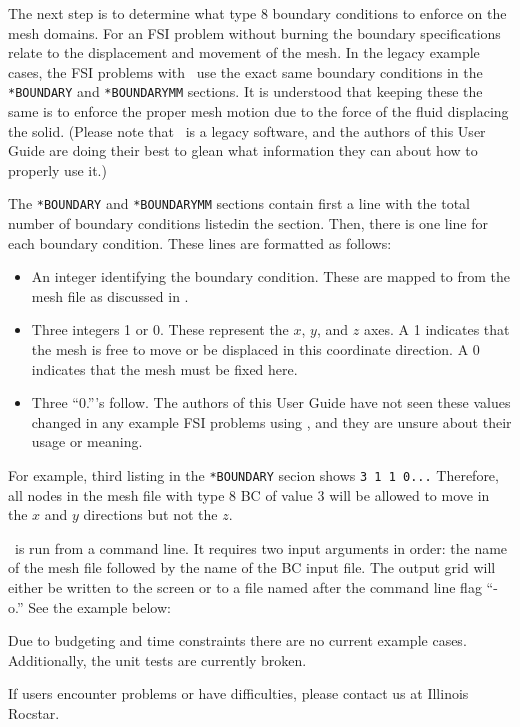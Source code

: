 The next step is to determine what type 8 boundary conditions to enforce on the mesh domains. For an FSI problem without burning the boundary specifications relate to the displacement and movement of the mesh. In the legacy example cases, the FSI problems with \rocfrac\, use the exact same boundary conditions in the \texttt{*BOUNDARY} and \texttt{*BOUNDARYMM} sections. It is understood that keeping these the same is to enforce the proper mesh motion due to the force of the fluid displacing the solid. (Please note that \rocfrac\, is a legacy software, and the authors of this User Guide are doing their best to glean what information they can about how to properly use it.) 

The \texttt{*BOUNDARY} and \texttt{*BOUNDARYMM} sections contain first a line with the total number of boundary conditions listedin the section. Then, there is one line for each boundary condition. These lines are formatted as follows:

\begin{itemize}
	\item An integer identifying the boundary condition. These are mapped to from the mesh file as discussed in .
	\item Three integers 1 or 0. These represent the $x$, $y$, and $z$ axes. A 1 indicates that the mesh is free to move or be displaced in this coordinate direction. A 0 indicates that the mesh must be fixed here.
	\item Three ``0.'''s follow. The authors of this User Guide have not seen these values changed in any example FSI problems using \rocfrac, and they are unsure about their usage or meaning.
\end{itemize}

For example, third listing in the \texttt{*BOUNDARY} secion shows \texttt{3 1 1 0...} Therefore, all nodes in the mesh file with type 8 BC of value 3 will be allowed to move in the $x$ and $y$ directions but not the $z$.


\grid\, is run from a  command line. It requires two input arguments in order: the name of the mesh file followed by the name of the BC input file. The output grid will either be written to the screen or to a file named after the command line flag ``-o.''  See the example below:




Due to budgeting and time constraints there are no current example cases. Additionally, the unit tests are currently broken. 


If users encounter problems or have difficulties, please contact us at Illinois Rocstar.

